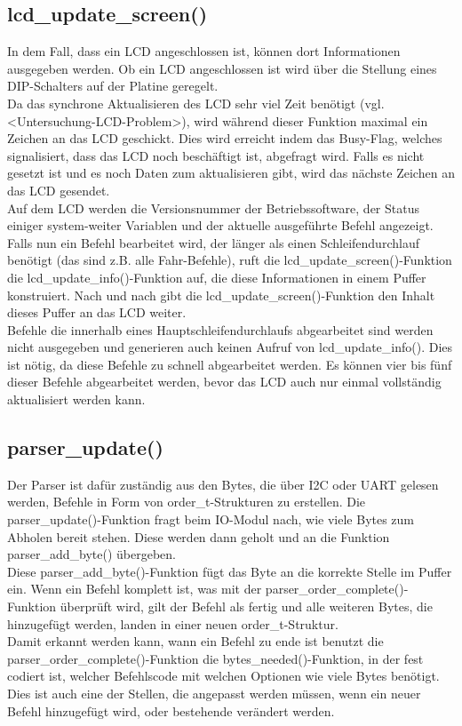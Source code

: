 \subsection{lcd\_update\_screen()}
In dem Fall, dass ein LCD angeschlossen ist, können dort Informationen ausgegeben werden. Ob ein LCD
angeschlossen ist wird über die Stellung eines DIP-Schalters auf der Platine geregelt.\\
Da das synchrone Aktualisieren des LCD sehr viel Zeit benötigt (vgl. <Untersuchung-LCD-Problem>), wird
während dieser Funktion maximal ein Zeichen an das LCD geschickt. Dies wird erreicht indem das Busy-Flag,
welches signalisiert, dass das LCD noch beschäftigt ist, abgefragt wird. Falls es nicht gesetzt ist und
es noch Daten zum aktualisieren gibt, wird das nächste Zeichen an das LCD gesendet.\\
Auf dem LCD werden die Versionsnummer der Betriebssoftware, der Status einiger system-weiter Variablen und
der aktuelle ausgeführte Befehl angezeigt. Falls nun ein Befehl bearbeitet wird, der länger als einen
Schleifendurchlauf benötigt (das sind z.B. alle Fahr-Befehle), ruft die lcd\_\-update\_\-screen()-Funktion
die lcd\_\-update\_\-info()-Funktion auf, die diese Informationen in einem Puffer konstruiert. Nach und nach
gibt die lcd\_\-update\_\-screen()-Funktion den Inhalt dieses Puffer an das LCD weiter.\\
Befehle die innerhalb eines Hauptschleifendurchlaufs abgearbeitet sind werden nicht ausgegeben und
generieren auch keinen Aufruf von lcd\_\-update\_\-info(). Dies ist nötig, da diese Befehle zu schnell abgearbeitet
werden. Es können vier bis fünf dieser Befehle abgearbeitet werden, bevor das LCD auch nur einmal vollständig
aktualisiert werden kann.
\subsection{parser\_update()}
Der Parser ist dafür zuständig aus den Bytes, die über I2C oder UART gelesen werden, Befehle in Form von
order\_t-Strukturen zu erstellen. Die parser\_\-update()-Funktion fragt beim IO-Modul nach, wie viele Bytes
zum Abholen bereit stehen. Diese werden dann geholt und an die Funktion parser\_\-add\_\-byte() übergeben.\\
Diese parser\_\-add\_\-byte()-Funktion fügt das Byte an die korrekte Stelle im Puffer ein. Wenn ein Befehl
komplett ist, was mit der parser\_\-order\_\-complete()-Funktion überprüft wird, gilt der Befehl als fertig und
alle weiteren Bytes, die hinzugefügt werden, landen in einer neuen order\_t-Struktur.\\
Damit erkannt werden kann, wann ein Befehl zu ende ist benutzt die parser\_\-order\_\-complete()-Funktion
die bytes\_\-needed()-Funktion, in der fest codiert ist, welcher Befehlscode mit welchen Optionen wie viele
Bytes benötigt. Dies ist auch eine der Stellen, die angepasst werden müssen, wenn ein neuer Befehl hinzugefügt
wird, oder bestehende verändert werden.
